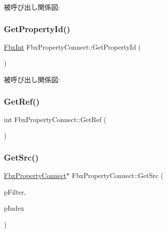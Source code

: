 被呼び出し関係図\+:
\mbox{\label{class_fbx_property_connect_af2dd9a64ff4fa806d330d7f21eeb9dbf}} 
\subsubsection{\texorpdfstring{Get\+Property\+Id()}{GetPropertyId()}}
{\footnotesize\ttfamily \hyperlink{fbxtypes_8h_a088fa96de3b0b3ea69f0f6afef525dfb}{Fbx\+Int} Fbx\+Property\+Connect\+::\+Get\+Property\+Id (\begin{DoxyParamCaption}{ }\end{DoxyParamCaption})}

被呼び出し関係図\+:
\mbox{\label{class_fbx_property_connect_a085658a0559ff68f4eb555f0d981e038}} 
\subsubsection{\texorpdfstring{Get\+Ref()}{GetRef()}}
{\footnotesize\ttfamily int Fbx\+Property\+Connect\+::\+Get\+Ref (\begin{DoxyParamCaption}{ }\end{DoxyParamCaption})}

\mbox{\label{class_fbx_property_connect_a7e32cdbf1b598eb7d187af169b9939e1}} 
\subsubsection{\texorpdfstring{Get\+Src()}{GetSrc()}}
{\footnotesize\ttfamily \hyperlink{class_fbx_property_connect}{Fbx\+Property\+Connect}$\ast$ Fbx\+Property\+Connect\+::\+Get\+Src (\begin{DoxyParamCaption}\item[{\hyperlink{class_fbx_connection_point_filter}{Fbx\+Connection\+Point\+Filter} $\ast$}]{p\+Filter,  }\item[{int}]{p\+Index }\end{DoxyParamCaption})}

